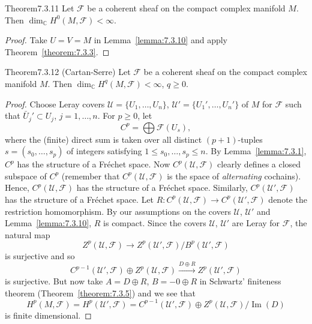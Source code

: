 \begin{originaltheorem}{Theorem}{7.3.11}
Let $\mathcal F$ be a coherent sheaf on the compact complex manifold $M$. Then $\dim_{\mathbb C}H^0(M,\mathcal F)<\infty$.
\end{originaltheorem}
\begin{proof}
Take $U=V=M$ in Lemma~\ref{lemma:7.3.10} and apply Theorem~\ref{theorem:7.3.3}.
\end{proof}
\begin{originaltheorem}{Theorem}{7.3.12 (Cartan-Serre)}
Let $\mathcal F$ be a coherent sheaf on the compact complex manifold $M$. Then $\dim_{\mathbb C}H^q(M,\mathcal F)<\infty$, $q\geq0$.
\end{originaltheorem}
\begin{proof}
Choose Leray covers $\mathcal U=\{U_1,\ldots,U_n\}$, $\mathcal U'=\{U_1',\ldots,U_n'\}$ of $M$ for $\mathcal F$ such that $\bar U_j'\subset U_j$, $j=1,\ldots,n$. For $p\geq0$, let
\[
C^p=\bigoplus\mathcal F(U_s),
\]
where the (finite) direct sum is taken over all distinct $(p+1)$-tuples $s=(s_0,\ldots,s_p)$ of integers satisfying $1\leq s_0,\ldots,s_p\leq n$. By Lemma~\ref{lemma:7.3.1}, $C^p$ has the structure of a Fr\'echet space. Now $C^p(\mathcal U,\mathcal F)$ clearly defines a closed subspace of $C^p$ (remember that $C^p(\mathcal U,\mathcal F)$ is the space of \emph{alternating} cochains). Hence, $C^p(\mathcal U,\mathcal F)$ has the structure of a Fr\'echet space. Similarly, $C^p(\mathcal U',\mathcal F)$ has the structure of a Fr\'echet space. Let $R:C^p(\mathcal U,\mathcal F)\to C^p(\mathcal U',\mathcal F)$ denote the restriction homomorphism. By our assumptions on the covers $\mathcal U$, $\mathcal U'$ and Lemma~\ref{lemma:7.3.10}, $R$ is compact. Since the covers $\mathcal U$, $\mathcal U'$ are Leray for $\mathcal F$, the natural map
\[
Z^p(\mathcal U,\mathcal F)\to Z^p(\mathcal U',\mathcal F)/B^p(\mathcal U',\mathcal F)
\]
is surjective and so
\[
C^{p-1}(\mathcal U',\mathcal F)\oplus Z^p(\mathcal U,\mathcal F)\xrightarrow{D\oplus R}Z^p(\mathcal U',\mathcal F)
\]
is surjective. But now take $A=D\oplus R$, $B=-0\oplus R$ in Schwartz' finiteness theorem (Theorem~\ref{theorem:7.3.5}) and we see that
\[
H^p(M,\mathcal F)=H^p(\mathcal U',\mathcal F)=C^{p-1}(\mathcal U',\mathcal F)\oplus Z^p(\mathcal U,\mathcal F)/\operatorname{Im}(D)
\]
is finite dimensional.
\end{proof}
